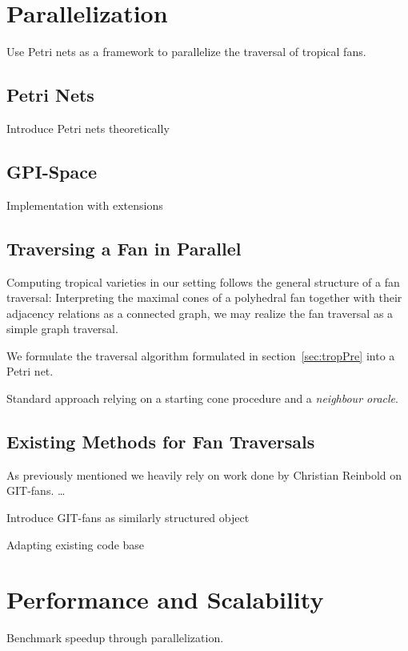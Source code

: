 \documentclass[
  paper=a4,
  DIV=14,
  fontsize=12pt,
  titlepage,
  bibliography=totoc,
  listof=totoc,
  pagesize=pdftex
]{scrartcl}
\numberwithin{figure}{section}
\numberwithin{equation}{section}
\numberwithin{table}{section}
\theoremstyle{definition}
\numberwithin{definition}{section}
\begin{document}
\section{Parallelization}

Use Petri nets as a framework to parallelize the traversal of tropical fans.

\subsection{Petri Nets}

Introduce Petri nets theoretically

\subsection{GPI-Space}

Implementation with extensions

\subsection{Traversing a Fan in Parallel}

Computing tropical varieties in our setting follows the general structure of a fan
traversal: Interpreting the maximal cones of a polyhedral fan together with their
adjacency relations as a connected graph, we may realize the fan traversal as a simple
graph traversal.

We formulate the traversal algorithm formulated in section~\ref{sec:tropPre} into a Petri
net.

Standard approach relying on a starting cone procedure and a \emph{neighbour oracle}.

\subsection{Existing Methods for Fan Traversals}

As previously mentioned we heavily rely on work done by Christian Reinbold on GIT-fans.
\dots

Introduce GIT-fans as similarly structured object

Adapting existing code base

\section{Performance and Scalability}

Benchmark speedup through parallelization.
\end{document}
